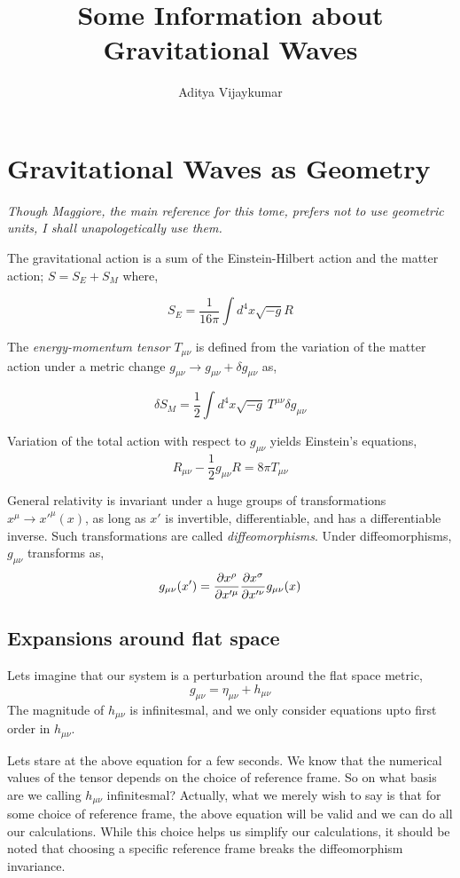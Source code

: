 \documentclass[a4paper,11pt]{article}
\title{\textbf{Some Information about Gravitational Waves}}
\author{Aditya Vijaykumar}
\affiliation{International Centre for Theoretical Sciences, Bengaluru, India.}
\begin{document}
\maketitle

\section{Gravitational Waves as Geometry}

\textit{Though Maggiore, the main reference for this tome, prefers not to use geometric units, I shall unapologetically use them.}

The gravitational action is a sum of the Einstein-Hilbert action and the matter action; $S = S_E + S_M$ where,

$$S_E = \frac{1}{16 \pi} \int d^4 x \sqrt{-g}R$$

The \textit{energy-momentum tensor} $T_{\mu \nu}$ is defined from the variation of the matter action under a metric change $g_{\mu \nu} \rightarrow g_{\mu \nu} + \delta g_{\mu \nu}$ as,

$$\delta S_M = \frac{1}{2}  \int d^4 x \sqrt{-g} \ T^{\mu \nu} \delta g_{\mu \nu}$$

Variation of the total action with respect to $g_{\mu \nu}$ yields Einstein's equations,
$$\boxed{R_{\mu \nu} - \frac{1}{2}g_{\mu \nu}R = 8 \pi T_{\mu \nu}}$$

General relativity is invariant under a huge groups of transformations $x^\mu \rightarrow x'^\mu(x)$, as long as $x'$ is invertible, differentiable, and has a differentiable inverse. Such transformations are called \textit{diffeomorphisms}. Under diffeomorphisms, $g_{\mu \nu}$ transforms as,
$$g_{\mu \nu}(x') = \pdv{x^\rho}{x'^\mu} \pdv{x^\sigma}{x'^\nu} g_{\mu \nu}(x)$$

\subsection{Expansions around flat space}
Lets imagine that our system is a perturbation around the flat space metric,
$$g_{\mu \nu} = \eta_{\mu \nu} + h_{\mu \nu}$$
The magnitude of $h_{\mu \nu}$ is infinitesmal, and we only consider equations upto first order in $h_{\mu \nu}$.

Lets stare at the above equation for a few seconds. We know that the numerical values of the tensor depends on the choice of reference frame. So on what basis are we calling $h_{\mu \nu}$ infinitesmal? Actually, what we merely wish to say is that for some choice of reference frame, the above equation will be valid and we can do all our calculations. While this choice helps us simplify our calculations, it should be noted that choosing a specific reference frame breaks the diffeomorphism invariance.
\end{document}
